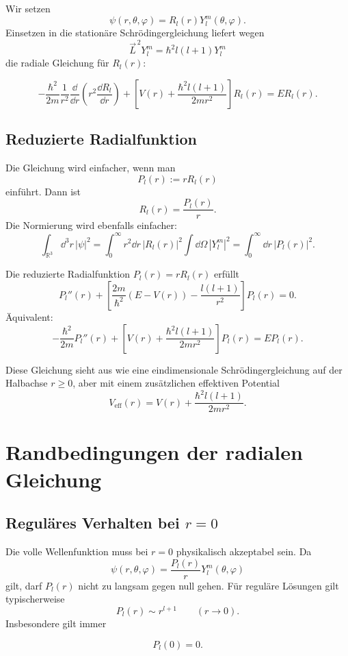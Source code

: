 Wir setzen
\[
    \psi(r,\theta,\varphi)=R_l(r)Y_l^m(\theta,\varphi).
\]
Einsetzen in die stationäre Schrödingergleichung liefert wegen
\[
    \vec L^{\,2}Y_l^m=\hbar^2l(l+1)Y_l^m
\]
die radiale Gleichung für \(R_l(r)\):
\begin{formulabox}
\[
    -\frac{\hbar^2}{2m}\frac{1}{r^2}\frac{\dd}{\dd r}
    \left(r^2\frac{\dd R_l}{\dd r}\right)
    +\left[V(r)+\frac{\hbar^2l(l+1)}{2mr^2}\right]R_l(r)
    =ER_l(r).
\]
\end{formulabox}

\subsection{Reduzierte Radialfunktion}

Die Gleichung wird einfacher, wenn man
\[
    P_l(r):=rR_l(r)
\]
einführt. Dann ist
\[
    R_l(r)=\frac{P_l(r)}{r}.
\]
Die Normierung wird ebenfalls einfacher:
\[
    \int_{\mathbb R^3}\dd^3r\,|\psi|^2
    =\int_0^\infty r^2\dd r\,|R_l(r)|^2
    \int\dd\Omega\,|Y_l^m|^2
    =\int_0^\infty \dd r\,|P_l(r)|^2.
\]

\begin{definitionbox}
Die reduzierte Radialfunktion \(P_l(r)=rR_l(r)\) erfüllt
\[
    P_l''(r)
    +\left[\frac{2m}{\hbar^2}(E-V(r))-\frac{l(l+1)}{r^2}\right]P_l(r)=0.
\]
Äquivalent:
\[
    -\frac{\hbar^2}{2m}P_l''(r)
    +\left[V(r)+\frac{\hbar^2l(l+1)}{2mr^2}\right]P_l(r)
    =EP_l(r).
\]
\end{definitionbox}

\begin{notebox}
Diese Gleichung sieht aus wie eine eindimensionale Schrödingergleichung auf der Halbachse \(r\ge 0\), aber mit einem zusätzlichen effektiven Potential
\[
    V_{\mathrm{eff}}(r)=V(r)+\frac{\hbar^2l(l+1)}{2mr^2}.
\]
\end{notebox}

\section{Randbedingungen der radialen Gleichung}

\subsection{Reguläres Verhalten bei \texorpdfstring{\(r=0\)}{r=0}}

Die volle Wellenfunktion muss bei \(r=0\) physikalisch akzeptabel sein. Da
\[
    \psi(r,\theta,\varphi)=\frac{P_l(r)}{r}Y_l^m(\theta,\varphi)
\]
gilt, darf \(P_l(r)\) nicht zu langsam gegen null gehen. Für reguläre Lösungen gilt typischerweise
\[
    P_l(r)\sim r^{l+1}
    \qquad (r\to 0).
\]
Insbesondere gilt immer
\begin{formulabox}
\[
    P_l(0)=0.
\]
\end{formulabox}

